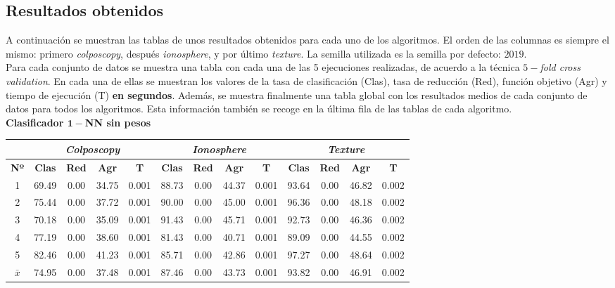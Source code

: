 \documentclass[12pt]{article}
\begin{document}
\subsection*{Resultados obtenidos}
\label{resultados}

A continuación se muestran las tablas de unos resultados obtenidos para cada uno de los algoritmos. El orden de las columnas es siempre el mismo: primero \textit{colposcopy}, después \textit{ionosphere}, y por último \textit{texture}. La semilla utilizada es la semilla por defecto: $2019$.\\

Para cada conjunto de datos se muestra una tabla con cada una de las 5 ejecuciones realizadas, de acuerdo a la técnica $5-$\textit{fold cross validation}. En cada una de ellas se muestran los valores de la tasa de clasificación (Clas), tasa de reducción (Red), función objetivo (Agr) y tiempo de ejecución (T) \textbf{en segundos}. Además, se muestra finalmente una tabla global con los resultados medios de cada conjunto de datos para todos los algoritmos. Esta información también se recoge en la última fila de las tablas de cada algoritmo.\\

{\color{red}\textbf{Clasificador $\boldsymbol{1-}$NN sin pesos}}

\begin{table}[ht!]
\begin{tabular}{ccccc|cccc|cccc}
\centering
 & \multicolumn{4}{c}{\textit{Colposcopy}} & \multicolumn{4}{c}{\textit{Ionosphere}} & \multicolumn{4}{c}{\textit{Texture}} \\ \hline
\textbf{Nº} & \textbf{Clas} & \textbf{Red} & \textbf{Agr} & \textbf{T} & \textbf{Clas} & \textbf{Red} & \textbf{Agr} & \textbf{T} & \textbf{Clas} & \textbf{Red} & \textbf{Agr} & \textbf{T} \\ \hline
1 & 69.49 & 0.00 & 34.75 & 0.001 & 88.73 & 0.00 & 44.37 & 0.001 & 93.64 & 0.00 & 46.82 & 0.002\\
2 & 75.44 & 0.00 & 37.72 & 0.001 & 90.00 & 0.00 & 45.00 & 0.001 & 96.36 & 0.00 & 48.18 & 0.002\\
3 & 70.18 & 0.00 & 35.09 & 0.001 & 91.43 & 0.00 & 45.71 & 0.001 & 92.73 & 0.00 & 46.36 & 0.002\\
4 & 77.19 & 0.00 & 38.60 & 0.001 & 81.43 & 0.00 & 40.71 & 0.001 & 89.09 & 0.00 & 44.55 & 0.002\\
5 & 82.46 & 0.00 & 41.23 & 0.001 & 85.71 & 0.00 & 42.86 & 0.001 & 97.27 & 0.00 & 48.64 & 0.002\\
\hline
$\bar{x}$  & 74.95 & 0.00 & 37.48 & 0.001 & 87.46 & 0.00 & 43.73 & 0.001 & 93.82 & 0.00 & 46.91 & 0.002
\end{tabular}
\end{table}
\end{document}
